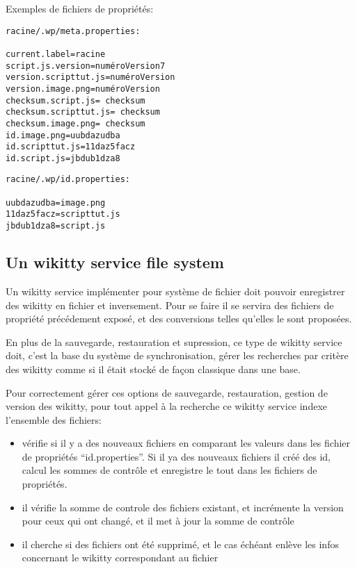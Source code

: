 Exemples de fichiers de propriétés:
\begin{verbatim}
racine/.wp/meta.properties:

current.label=racine
script.js.version=numéroVersion7
version.scripttut.js=numéroVersion
version.image.png=numéroVersion
checksum.script.js= checksum
checksum.scripttut.js= checksum
checksum.image.png= checksum
id.image.png=uubdazudba
id.scripttut.js=11daz5facz
id.script.js=jbdub1dza8
\end{verbatim}

\begin{verbatim}
racine/.wp/id.properties:

uubdazudba=image.png
11daz5facz=scripttut.js
jbdub1dza8=script.js
\end{verbatim}

\subsection{Un wikitty service file system}

Un wikitty service implémenter pour système de fichier doit pouvoir enregistrer
des wikitty en fichier et inversement. Pour se faire il se servira des fichiers
de propriété précédement exposé, et des conversions telles qu'elles le sont
proposées.

En plus de la sauvegarde, restauration et supression, ce type de wikitty service
doit, c'est la base du système de synchronisation, gérer les recherches par
critère des wikitty comme si il était stocké de façon classique dans une base.

Pour correctement gérer ces options de sauvegarde, restauration, gestion de
version des wikitty, pour tout appel à la recherche ce wikitty service indexe
l'ensemble des fichiers:
\begin{itemize}
\item vérifie si il y a des nouveaux fichiers en comparant les valeurs dans les
fichier de propriétés ``id.properties''. Si il ya des nouveaux fichiers il créé
des id, calcul les sommes de contrôle et enregistre le tout dans les fichiers de
propriétés.
\item il vérifie la somme de controle des fichiers existant, et incrémente la
version pour ceux qui ont changé, et il met à jour la somme de contrôle
\item il cherche si des fichiers ont été supprimé, et le cas échéant enlève les
infos concernant le wikitty correspondant au fichier
\end{itemize}

